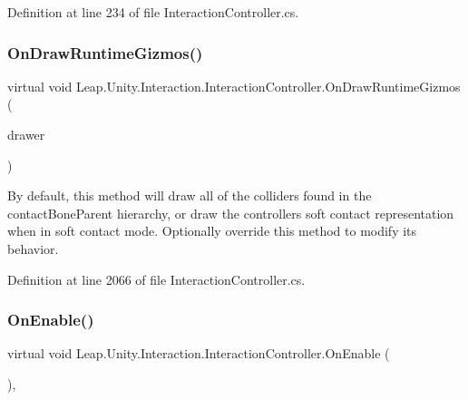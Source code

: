 Definition at line 234 of file Interaction\+Controller.\+cs.

\mbox{\label{class_leap_1_1_unity_1_1_interaction_1_1_interaction_controller_aea16165952781a04b0da774cca6561a1}} 
\subsubsection{\texorpdfstring{OnDrawRuntimeGizmos()}{OnDrawRuntimeGizmos()}}
{\footnotesize\ttfamily virtual void Leap.\+Unity.\+Interaction.\+Interaction\+Controller.\+On\+Draw\+Runtime\+Gizmos (\begin{DoxyParamCaption}\item[{\mbox{\hyperlink{class_leap_1_1_unity_1_1_runtime_gizmos_1_1_runtime_gizmo_drawer}{Runtime\+Gizmo\+Drawer}}}]{drawer }\end{DoxyParamCaption})\hspace{0.3cm}{\ttfamily [virtual]}}



By default, this method will draw all of the colliders found in the contact\+Bone\+Parent hierarchy, or draw the controller\textquotesingle{}s soft contact representation when in soft contact mode. Optionally override this method to modify its behavior. 



Definition at line 2066 of file Interaction\+Controller.\+cs.

\mbox{\label{class_leap_1_1_unity_1_1_interaction_1_1_interaction_controller_a885d51f3ef8f88ce9be49f77fb9b1198}} 
\subsubsection{\texorpdfstring{OnEnable()}{OnEnable()}}
{\footnotesize\ttfamily virtual void Leap.\+Unity.\+Interaction.\+Interaction\+Controller.\+On\+Enable (\begin{DoxyParamCaption}{ }\end{DoxyParamCaption})\hspace{0.3cm}{\ttfamily [protected]}, {\ttfamily [virtual]}}




